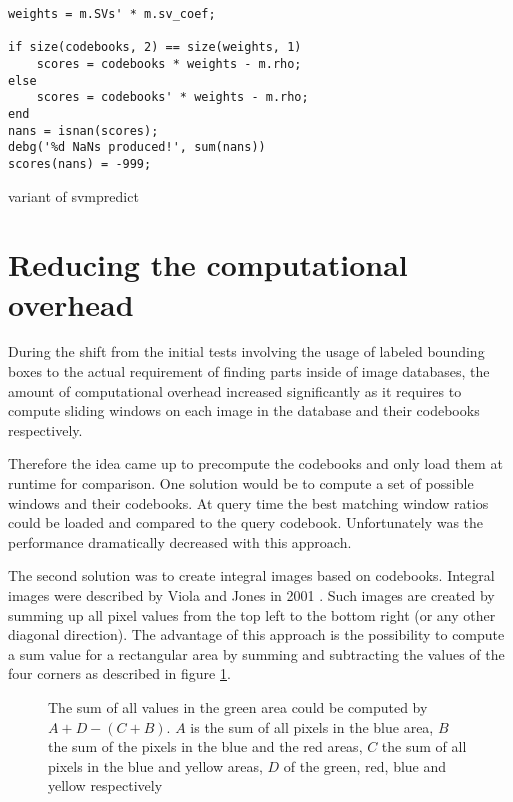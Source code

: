 \begin{listing}
\begin{verbatim}
weights = m.SVs' * m.sv_coef;

if size(codebooks, 2) == size(weights, 1)
    scores = codebooks * weights - m.rho;
else
    scores = codebooks' * weights - m.rho;
end
nans = isnan(scores);
debg('%d NaNs produced!', sum(nans))
scores(nans) = -999;
\end{verbatim}
\caption{\MATLAB variant of svmpredict}
\label{lst:matlab_svm_predict}
\end{listing}

\section{Reducing the computational overhead}

During the shift from the initial tests involving the usage of labeled bounding boxes to the actual requirement of finding parts inside of image databases, the amount of computational overhead increased significantly as it requires to compute sliding windows on each image in the database and their codebooks respectively.

Therefore the idea came up to precompute the codebooks and only load them at runtime for comparison. One solution would be to compute a set of possible windows and their codebooks. At query time the best matching window ratios could be loaded and compared to the query codebook. Unfortunately was the performance dramatically decreased with this approach.

The second solution was to create integral images based on codebooks. Integral images were described by Viola and Jones in 2001 \cite{viola2001rapid}. Such images are created by summing up all pixel values from the top left to the bottom right (or any other diagonal direction). The advantage of this approach is the possibility to compute a sum value for a rectangular area by summing and subtracting the values of the four corners as described in figure \ref{fig:integral_image}. 

\begin{figure}
\caption[Sum of area in integral image]{The sum of all values in the green area could be computed by $A+D-(C+B)$. $A$ is the sum of all pixels in the blue area, $B$ the sum of the pixels in the blue and the red areas, $C$ the sum of all pixels in the blue and yellow areas, $D$ of the green, red, blue and yellow respectively}
\label{fig:integral_image}
\end{figure}

